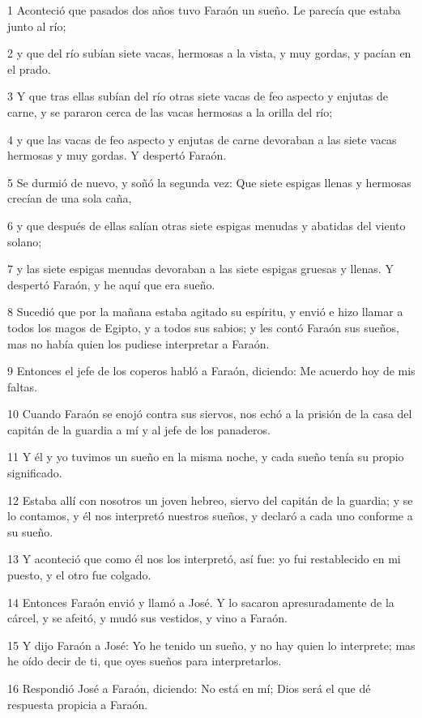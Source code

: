 \par 1 Aconteció que pasados dos años tuvo Faraón un sueño. Le parecía que estaba junto al río;
\par 2 y que del río subían siete vacas, hermosas a la vista, y muy gordas, y pacían en el prado.
\par 3 Y que tras ellas subían del río otras siete vacas de feo aspecto y enjutas de carne, y se pararon cerca de las vacas hermosas a la orilla del río;
\par 4 y que las vacas de feo aspecto y enjutas de carne devoraban a las siete vacas hermosas y muy gordas. Y despertó Faraón.
\par 5 Se durmió de nuevo, y soñó la segunda vez: Que siete espigas llenas y hermosas crecían de una sola caña,
\par 6 y que después de ellas salían otras siete espigas menudas y abatidas del viento solano;
\par 7 y las siete espigas menudas devoraban a las siete espigas gruesas y llenas. Y despertó Faraón, y he aquí que era sueño.
\par 8 Sucedió que por la mañana estaba agitado su espíritu, y envió e hizo llamar a todos los magos de Egipto, y a todos sus sabios; y les contó Faraón sus sueños, mas no había quien los pudiese interpretar a Faraón.
\par 9 Entonces el jefe de los coperos habló a Faraón, diciendo: Me acuerdo hoy de mis faltas.
\par 10 Cuando Faraón se enojó contra sus siervos, nos echó a la prisión de la casa del capitán de la guardia a mí y al jefe de los panaderos.
\par 11 Y él y yo tuvimos un sueño en la misma noche, y cada sueño tenía su propio significado.
\par 12 Estaba allí con nosotros un joven hebreo, siervo del capitán de la guardia; y se lo contamos, y él nos interpretó nuestros sueños, y declaró a cada uno conforme a su sueño.
\par 13 Y aconteció que como él nos los interpretó, así fue: yo fui restablecido en mi puesto, y el otro fue colgado.
\par 14 Entonces Faraón envió y llamó a José. Y lo sacaron apresuradamente de la cárcel, y se afeitó, y mudó sus vestidos, y vino a Faraón.
\par 15 Y dijo Faraón a José: Yo he tenido un sueño, y no hay quien lo interprete; mas he oído decir de ti, que oyes sueños para interpretarlos.
\par 16 Respondió José a Faraón, diciendo: No está en mí; Dios será el que dé respuesta propicia a Faraón.
